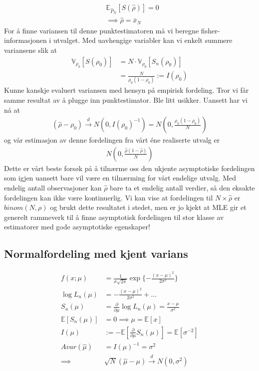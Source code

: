 \begin{align}
&\mathbb{E}_{\hat{P}_N}\left[S(\hat{\rho})\right] = 0 \\
& \implies \hat{\rho} = \bar{x}_N
\end{align}
For å finne variansen til denne punktestimatoren må vi beregne fisher-informasjonen i utvalget. Med uavhengige variabler kan vi enkelt summere variansene slik at
\begin{align}
\mathbb{V}_{\rho_0}\left[S(\rho_0)\right] &= N\cdot \mathbb{V}_{\rho_0}\left[S_n(\rho_0)\right] \\
&=\frac{N}{\rho_0(1-\rho_0)} := I(\rho_0)
\end{align}
Kunne kanskje evaluert variansen med hensyn på empirisk fordeling. Tror vi får samme resultat av å plugge inn punktestimator. Ble litt usikker. Uansett har vi nå at 
\begin{align}
(\hat{\rho}-\rho_0) \overset{d}{\to} N\left(0,I(\rho_0)^{-1}\right) = N\left(0,\frac{\rho_0(1-\rho_0)}{N}\right)
\end{align}
og vår estimasjon av denne fordelingen fra vårt éne realiserte utvalg er 
\begin{align}
N\left(0,\frac{\hat{\rho}(1-\hat{\rho})}{N}\right)
\end{align}
Dette er vårt beste forsøk på å tilnærme oss den ukjente asymptotiske fordelingen som igjen uansett bare vil være en tilnærming for vårt endelige utvalg. Med endelig antall observasjoner kan $\hat{\rho}$ bare ta et endelig antall verdier, så den eksakte fordelingen kan ikke være kontinuerlig. Vi kan vise at fordelingen til $N\times \hat{\rho}$ er $binom(N,\rho)$ og brukt dette resultatet i stedet, men er jo kjekt at MLE gir et generelt rammeverk til å finne asymptotisk fordelingen til stor klasse av estimatorer med gode asymptotiske egenskaper! 
\subsection{Normalfordeling med kjent varians}
\begin{align}
f(x;\mu)&=\frac{1}{\sigma \sqrt{2\pi}}\exp\{-\frac{(x-\mu)^2}{2\sigma^2}\} \\
\log L_n(\mu) &= -\frac{(x-\mu)^2}{2\sigma^2} + ... \\
S_n(\mu) &= \frac{\partial}{\partial \mu} \log L_n(\mu) = \frac{x-\mu}{\sigma^2} \\
\mathbb{E}[S_n(\mu)]&=0 \implies \mu = \mathbb{E}[x] \\
I(\mu) &:= -\mathbb{E}\left[\frac{\partial}{\partial \mu} S_n(\mu)\right] = \mathbb{E}[\sigma^{-2}] \\
Avar(\hat{\mu}) &= I(\mu)^{-1} = \sigma^2 \\
\implies&\sqrt{N}(\hat{\mu}-\mu) \overset{d}{\to} N(0,\sigma^2)
\end{align}
